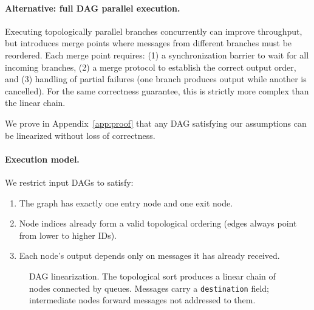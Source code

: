 \documentclass[11pt,a4paper]{article}
\begin{document}
\paragraph{Alternative: full DAG parallel execution.}
Executing topologically parallel branches concurrently can improve throughput, but introduces merge points where messages from different branches must be reordered. Each merge point requires: (1) a synchronization barrier to wait for all incoming branches, (2) a merge protocol to establish the correct output order, and (3) handling of partial failures (one branch produces output while another is cancelled). For the same correctness guarantee, this is strictly more complex than the linear chain.

We prove in Appendix~\ref{app:proof} that any DAG satisfying our assumptions can be linearized without loss of correctness.

\paragraph{Execution model.}
We restrict input DAGs to satisfy:
\begin{enumerate}[nosep]
    \item The graph has exactly one entry node and one exit node.
    \item Node indices already form a valid topological ordering (edges always point from lower to higher IDs).
    \item Each node's output depends only on messages it has already received.
\end{enumerate}

\begin{figure}[h]
    \centering
    \caption{DAG linearization. The topological sort produces a linear chain of nodes connected by queues. Messages carry a \texttt{destination} field; intermediate nodes forward messages not addressed to them.}
    \label{fig:linearization}
\end{figure}
\end{document}
